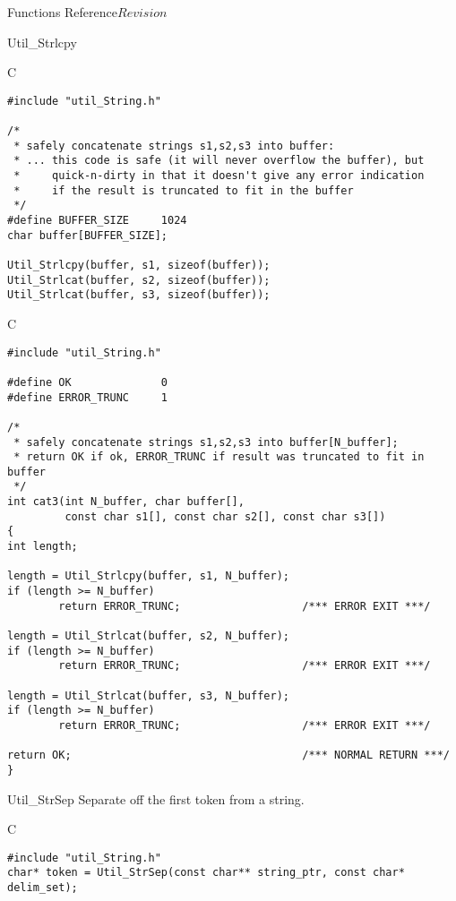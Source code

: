 \begin{cactuspart}{ Functions Reference}{}{$Revision$}
\begin{FunctionDescription}{Util\_Strlcpy}
\begin{ExampleSection}
\begin{Example}{C}
\begin{verbatim}
#include "util_String.h"

/*
 * safely concatenate strings s1,s2,s3 into buffer:
 * ... this code is safe (it will never overflow the buffer), but
 *     quick-n-dirty in that it doesn't give any error indication
 *     if the result is truncated to fit in the buffer
 */
#define BUFFER_SIZE     1024
char buffer[BUFFER_SIZE];

Util_Strlcpy(buffer, s1, sizeof(buffer));
Util_Strlcat(buffer, s2, sizeof(buffer));
Util_Strlcat(buffer, s3, sizeof(buffer));
\end{verbatim}
\end{Example}
\begin{Example}{C}
\begin{verbatim}
#include "util_String.h"

#define OK              0
#define ERROR_TRUNC     1

/*
 * safely concatenate strings s1,s2,s3 into buffer[N_buffer];
 * return OK if ok, ERROR_TRUNC if result was truncated to fit in buffer
 */
int cat3(int N_buffer, char buffer[],
         const char s1[], const char s2[], const char s3[])
{
int length;

length = Util_Strlcpy(buffer, s1, N_buffer);
if (length >= N_buffer)
        return ERROR_TRUNC;                   /*** ERROR EXIT ***/

length = Util_Strlcat(buffer, s2, N_buffer);
if (length >= N_buffer)
        return ERROR_TRUNC;                   /*** ERROR EXIT ***/

length = Util_Strlcat(buffer, s3, N_buffer);
if (length >= N_buffer)
        return ERROR_TRUNC;                   /*** ERROR EXIT ***/

return OK;                                    /*** NORMAL RETURN ***/
}
\end{verbatim}
\end{Example}
\end{ExampleSection}
\end{FunctionDescription}


\begin{FunctionDescription}{Util\_StrSep}
\label{Util-StrSep}
Separate off the first token from a string.

\begin{SynopsisSection}
\begin{Synopsis}{C}
\begin{verbatim}
#include "util_String.h"
char* token = Util_StrSep(const char** string_ptr, const char* delim_set);
\end{verbatim}
\end{Synopsis}
\end{SynopsisSection}


\end{FunctionDescription}
\end{cactuspart}
